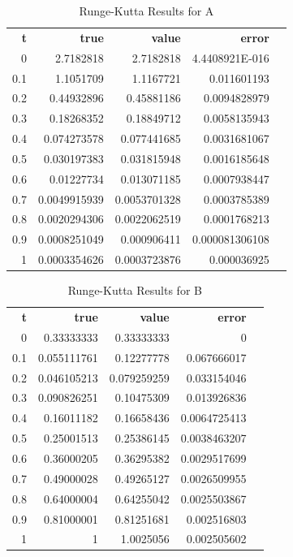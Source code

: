 \documentclass{article}
\begin{document}
\begin{table}
\footnotesize
\centering
\caption{Runge-Kutta Results for A}
\label{tab:a_rk}
\begin{tabular}{rrrrl}
\textbf{t} & \textbf{true} & \textbf{value} & \textbf{error} &  \\
0          & 2.7182818     & 2.7182818      & 4.4408921E-016 &  \\
0.1        & 1.1051709     & 1.1167721      & 0.011601193    &  \\
0.2        & 0.44932896    & 0.45881186     & 0.0094828979   &  \\
0.3        & 0.18268352    & 0.18849712     & 0.0058135943   &  \\
0.4        & 0.074273578   & 0.077441685    & 0.0031681067   &  \\
0.5        & 0.030197383   & 0.031815948    & 0.0016185648   &  \\
0.6        & 0.01227734    & 0.013071185    & 0.0007938447   &  \\
0.7        & 0.0049915939  & 0.0053701328   & 0.0003785389   &  \\
0.8        & 0.0020294306  & 0.0022062519   & 0.0001768213   &  \\
0.9        & 0.0008251049  & 0.000906411    & 0.000081306108 &  \\
1          & 0.0003354626  & 0.0003723876   & 0.000036925    
\end{tabular}
\end{table}


\begin{table}
\footnotesize
\centering
\caption{Runge-Kutta Results for B}
\label{tab:b_rk}
\begin{tabular}{rrrrl}
\textbf{t} & \textbf{true} & \textbf{value} & \textbf{error} &  \\
0          & 0.33333333    & 0.33333333     & 0              &  \\
0.1        & 0.055111761   & 0.12277778     & 0.067666017    &  \\
0.2        & 0.046105213   & 0.079259259    & 0.033154046    &  \\
0.3        & 0.090826251   & 0.10475309     & 0.013926836    &  \\
0.4        & 0.16011182    & 0.16658436     & 0.0064725413   &  \\
0.5        & 0.25001513    & 0.25386145     & 0.0038463207   &  \\
0.6        & 0.36000205    & 0.36295382     & 0.0029517699   &  \\
0.7        & 0.49000028    & 0.49265127     & 0.0026509955   &  \\
0.8        & 0.64000004    & 0.64255042     & 0.0025503867   &  \\
0.9        & 0.81000001    & 0.81251681     & 0.002516803    &  \\
1          & 1             & 1.0025056      & 0.002505602    & 
\end{tabular}
\end{table}
\end{document}

